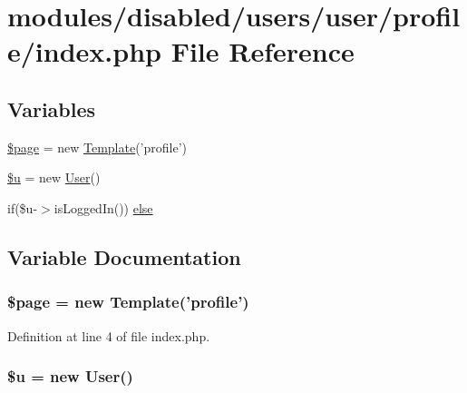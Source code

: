 \hypertarget{modules_2disabled_2users_2user_2profile_2index_8php}{\section{modules/disabled/users/user/profile/index.php File Reference}
\label{modules_2disabled_2users_2user_2profile_2index_8php}
}
\subsection*{Variables}
\begin{DoxyCompactItemize}
\item 
\hyperlink{modules_2disabled_2users_2user_2profile_2index_8php_a0a44e6760141442bb439b1ab1395d8ff}{\$page} = new \hyperlink{class_template}{Template}('profile')
\item 
\hyperlink{modules_2disabled_2users_2user_2profile_2index_8php_ad9bcfd597eba04db946451e8368a1f05}{\$u} = new \hyperlink{class_user}{User}()
\item 
if(\$u-\/$>$is\-Logged\-In()) \hyperlink{modules_2disabled_2users_2user_2profile_2index_8php_a422753eb4fdd2194fafd5f10508e8695}{else}
\end{DoxyCompactItemize}


\subsection{Variable Documentation}
\hypertarget{modules_2disabled_2users_2user_2profile_2index_8php_a0a44e6760141442bb439b1ab1395d8ff}{
\subsubsection[{\$page}]{\setlength{\rightskip}{0pt plus 5cm}\$page = new {\bf Template}('profile')}}\label{modules_2disabled_2users_2user_2profile_2index_8php_a0a44e6760141442bb439b1ab1395d8ff}


Definition at line 4 of file index.\-php.

\hypertarget{modules_2disabled_2users_2user_2profile_2index_8php_ad9bcfd597eba04db946451e8368a1f05}{
\subsubsection[{\$u}]{\setlength{\rightskip}{0pt plus 5cm}\$u = new {\bf User}()}}\label{modules_2disabled_2users_2user_2profile_2index_8php_ad9bcfd597eba04db946451e8368a1f05}


